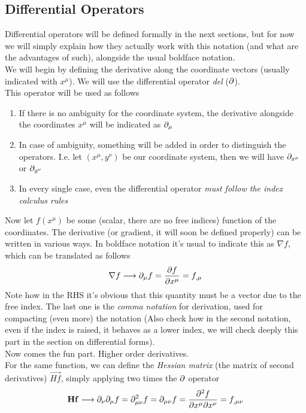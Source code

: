 \documentclass[../complete.tex]{subfiles}
\begin{document}
\subsection{Differential Operators}
Differential operators will be defined formally in the next sections, but for now we will simply explain how they actually work with this notation (and what are the advantages of such), alongside the usual boldface notation.\\
We will begin by defining the derivative along the coordinate vectors (usually indicated with $x^\mu$). We will use the differential operator \textit{del} ($\partial$).\\
This operator will be used as follows
\begin{enumerate}
\item If there is no ambiguity for the coordinate system, the derivative alongside the coordinates $x^\mu$ will be indicated as $\partial_\mu$
\item In case of ambiguity, something will be added in order to distinguish the operators. I.e. let $(x^\mu,y^\nu)$ be our coordinate system, then we will have $\partial_{x^\mu}$ or $\partial_{y^\nu}$
\item In every single case, even the differential operator \emph{must follow the index calculus rules}
\end{enumerate}
Now let $f(x^\mu)$ be some (scalar, there are no free indices) function of the coordinates. The derivative (or gradient, it will soon be defined properly) can be written in various ways. In boldface notation it's usual to indicate this as $\nabla f$, which can be translated as follows
\begin{equation}
	\nabla f\longrightarrow\partial_\mu f=\pdv{f}{x^\mu}=f_{,\mu}
	\label{eq:derivationenot}
\end{equation}
Note how in the RHS it's obvious that this quantity must be a vector due to the free index. The last one is the \textit{comma notation} for derivation, used for compacting (even more) the notation (Also check how in the second notation, even if the index is raised, it behaves as a lower index, we will check deeply this part in the section on differential forms).\\
Now comes the fun part. Higher order derivatives.\\
For the same function, we can define the \textit{Hessian matrix} (the matrix of second derivatives) $\vec{Hf}$, simply applying two times the $\partial$ operator
\begin{equation}
	\mathbf{Hf}\overset{}{\longrightarrow}\partial_\nu\partial_\mu f=\partial^2_{\mu\nu}f=\partial_{\mu\nu}f=\pdv[2]{f}{x^\mu}{x^\nu}=f_{,\mu\nu}
	\label{eq:hessianenot}
\end{equation}
\end{document}
